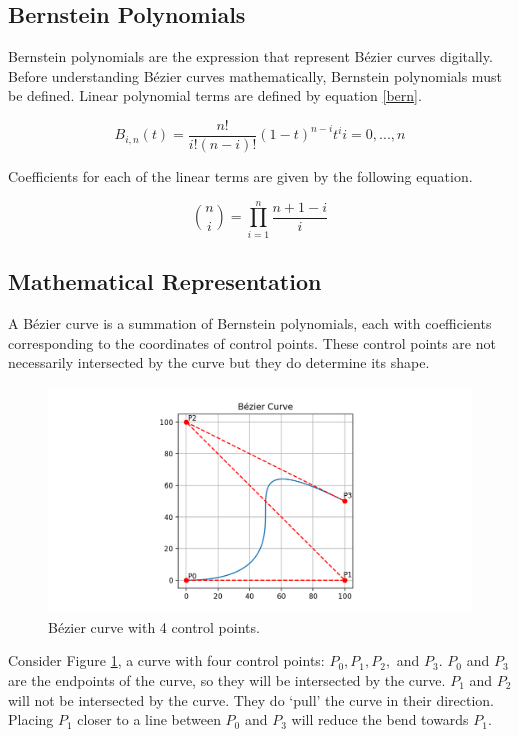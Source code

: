 \documentclass[12pt,letterpaper]{article}
\begin{document}
\subsection{Bernstein Polynomials}
Bernstein polynomials are the expression that represent B\'ezier curves digitally. Before understanding B\'ezier curves mathematically, Bernstein polynomials must be defined. Linear polynomial terms are defined by equation \ref{bern}. 

\begin{equation}
    \label{bern}
    B_{i,n}(t) = \frac{n!}{i!(n-i)!}(1-t)^{n-i}t^i
    i=0,...,n
\end{equation}


Coefficients for each of the linear terms are given by the following equation. 

\begin{equation}
    \label{berncoeff}
    \binom{n}{i} = \displaystyle\prod_{i=1}^{n} \frac{n+1-i}{i}
\end{equation}

\subsection{Mathematical Representation}
A B\'ezier curve is a summation of Bernstein polynomials, each with coefficients corresponding to the coordinates of control points. These control points are not necessarily intersected by the curve but they do determine its shape.

\begin{figure}[H]
    \includegraphics[width=15cm]{Figure_1}
    \centering
    \caption{B\'ezier curve with 4 control points.}
    \label{fig:demo}
\end{figure}

Consider Figure \ref{fig:demo}, a curve with four control points: $P_0, P_1, P_2,$ and $P_3$. $P_0$ and $P_3$ are the endpoints of the curve, so they will be intersected by the curve. $P_1$ and $P_2$ will not be intersected by the curve. They do ‘pull’ the curve in their direction. Placing $P_1$ closer to a line between $P_0$ and $P_3$ will reduce the bend towards $P_1$.
\end{document}
